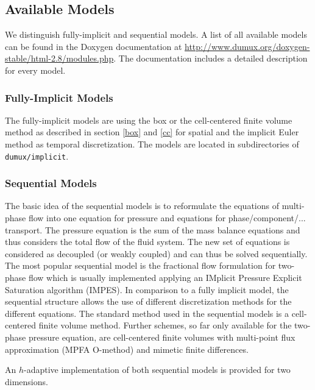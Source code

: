 \subsection{Available Models}
We distinguish fully-implicit and sequential models. A list of all available models can be found
in the Doxygen documentation at
\url{http://www.dumux.org/doxygen-stable/html-2.8/modules.php}.
The documentation includes a detailed description for every model.

\subsubsection{Fully-Implicit Models}
The fully-implicit models are using the box or the
cell-centered finite volume method as described in section \ref{box} and \ref{cc}
for spatial and the implicit Euler
method as temporal discretization. The models are located in
subdirectories of \texttt{dumux/implicit}.

\subsubsection{Sequential Models}
The basic idea of the sequential models is to reformulate the
equations of multi-phase flow into one equation for
pressure and equations for phase/component/... transport. The pressure equation
is the sum of the mass balance equations and thus considers the total flow of the
fluid system. The new set of equations is considered as decoupled (or weakly coupled)
and can thus be solved sequentially. The most popular sequential model is the
fractional flow formulation for two-phase flow which is usually implemented applying
an IMplicit Pressure Explicit Saturation algorithm (IMPES).
In comparison to a fully implicit model, the sequential structure allows the use of
different discretization methods for the different equations. The standard method
used in the sequential models is a cell-centered finite volume method. Further schemes,
so far only available for the two-phase pressure equation, are cell-centered finite
volumes with multi-point flux approximation (MPFA O-method) and mimetic finite differences.

An $h$-adaptive implementation of both sequential models is provided for two dimensions.
